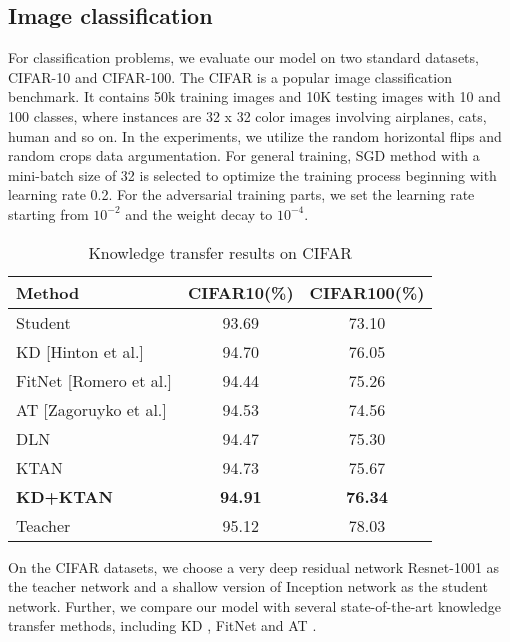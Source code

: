 \documentclass[letterpaper]{article} %
\begin{document}
\subsection{Image classification}

For classification problems, we evaluate our model on two standard datasets, CIFAR-10 and CIFAR-100. The CIFAR is a popular image classification benchmark. It contains 50k training images and 10K testing images with 10 and 100 classes, where instances are 32 x 32 color images involving airplanes, cats, human and so on. In the experiments, we utilize the random horizontal flips and random crops data argumentation. For general training, SGD method with a mini-batch size of 32 is selected to optimize the training process beginning with learning rate 0.2. For the adversarial training parts, we set the learning rate starting from $10^{-2}$ and the weight decay to $10^{-4}$.

\begin{table}[htb!]
	\centering
	\caption{Knowledge transfer results on CIFAR}
	\begin{tabular}{lcc}
		\hline
		\textbf{Method} & \textbf{CIFAR10(\%)} & \textbf{CIFAR100(\%)} \\
		\hline
		Student & 93.69 & 73.10  \\
		KD [Hinton et al.] & 94.70  & 76.05  \\
		FitNet [Romero et al.] & 94.44  & 75.26  \\
		AT [Zagoruyko et al.] & 94.53  &  74.56 \\
		DLN & 94.47  &  75.30 \\
		KTAN & 94.73  &  75.67 \\
		\textbf{KD+KTAN} & \textbf{94.91}  &  \textbf{76.34} \\
		\hline
		Teacher & 95.12  & 78.03  \\
		\hline
	\end{tabular}
\end{table}

On the CIFAR datasets, we choose a very deep residual network Resnet-1001 \cite{he2016identity} as the teacher network and a shallow version of Inception network \cite{ioffe2015batch} as the student network. Further, we compare our model with several state-of-the-art knowledge transfer methods, including KD \cite{hinton2015distilling}, FitNet \cite{romero2014fitnets} and AT \cite{zagoruyko2016paying}.
\end{document}
